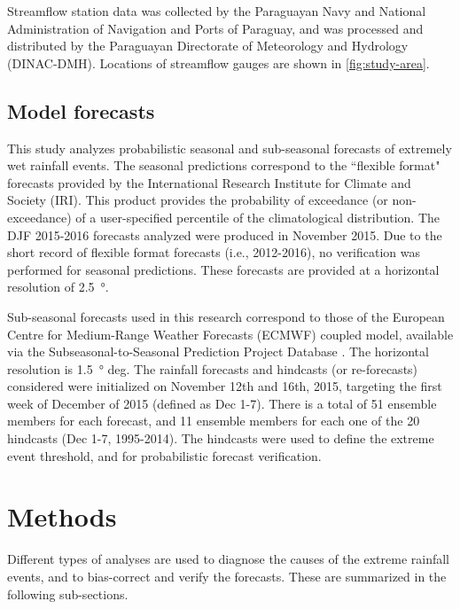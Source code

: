 \documentclass[twocol]{ametsoc}
\begin{document}
Streamflow station data was collected by the Paraguayan Navy and National Administration of Navigation and Ports of Paraguay, and was processed and distributed by the Paraguayan Directorate of Meteorology and Hydrology (DINAC-DMH).
Locations of streamflow gauges are shown in \cref{fig:study-area}.

\subsection{Model forecasts}
This study analyzes probabilistic seasonal and sub-seasonal forecasts of extremely wet rainfall events.
The seasonal predictions correspond to the ``flexible format" forecasts provided by the International Research Institute for Climate and Society (IRI).
This product provides the probability of exceedance (or non-exceedance) of a user-specified percentile of the climatological distribution.
The DJF 2015-2016 forecasts analyzed were produced in November 2015.
Due to the short record of flexible format forecasts (i.e., 2012-2016), no verification was performed for seasonal predictions.
These forecasts are provided at a horizontal resolution of \SI{2.5}{\degree}.

Sub-seasonal forecasts used in this research correspond to those of the European Centre for Medium-Range Weather Forecasts (ECMWF) coupled model, available via the Subseasonal-to-Seasonal Prediction Project Database \citep{Vitart2016}.
The horizontal resolution is \SI{1.5}{\degree} deg.
The rainfall forecasts and hindcasts (or re-forecasts) considered were initialized on November 12th and 16th, 2015, targeting the first week of December of 2015 (defined as Dec 1-7).
There is a total of 51 ensemble members for each forecast, and 11 ensemble members for each one of the 20 hindcasts (Dec 1-7, 1995-2014).
The hindcasts were used to define the extreme event threshold, and for probabilistic forecast verification.


\section{Methods} \label{sec:methods}

Different types of analyses are used to diagnose the causes of the extreme rainfall events, and to bias-correct and verify the forecasts.
These are summarized in the following sub-sections.
\end{document}
